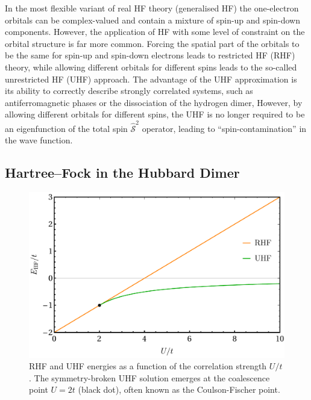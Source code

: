\documentclass[aps,prb,reprint,noshowkeys,superscriptaddress]{revtex4-1}
\begin{document}
In the most flexible variant of real HF theory (generalised HF) the one-electron orbitals can be complex-valued
and contain a mixture of spin-up and spin-down components.\cite{Mayer_1993,Jimenez-Hoyos_2011}
However, the application of HF with some level of constraint on the orbital structure is far more common.
Forcing the spatial part of the orbitals to be the same for spin-up and spin-down electrons leads to restricted HF (RHF) theory, 
while allowing different orbitals for different spins leads to the so-called unrestricted HF (UHF) approach.\cite{StuberPaldus}
The advantage of the UHF approximation is its ability to correctly describe strongly correlated systems, 
such as antiferromagnetic phases\cite{Slater_1951} or the dissociation of the hydrogen dimer,\cite{Coulson_1949}
However, by allowing different orbitals for different spins, the UHF is no longer required to be an eigenfunction of 
the total spin $\hat{\mathcal{S}}^2$ operator, leading to ``spin-contamination'' in the wave function.

\subsection{Hartree--Fock in the Hubbard Dimer}
\label{sec:HF_hubbard}

\begin{figure}
    \includegraphics[width=\linewidth]{HF_real.pdf}
    \caption{\label{fig:HF_real}
    RHF and UHF energies as a function of the correlation strength $U/t$. 
    The symmetry-broken UHF solution emerges at the coalescence point $U=2t$ (black dot), often known as the Coulson-Fischer point.}
\end{figure}
\end{document}
